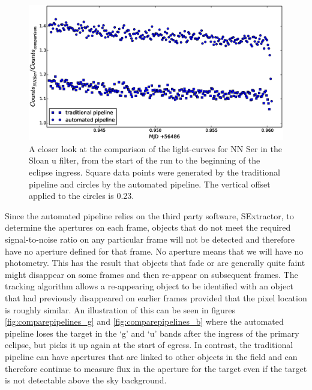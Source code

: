 \begin{figure}
\centering
\includegraphics[width=140mm]{images/nn_ser_compare_zoom_b.eps}
\caption{A closer look at the comparison of the light-curves for NN Ser in the Sloan u filter, from the start of the run to the beginning of the eclipse ingress. Square data points were generated by the traditional pipeline and circles by the automated pipeline. The vertical offset applied to the circles is 0.23. }
\label{fig:comparepipelines_zoom_b}
\end{figure}

Since the automated pipeline relies on the third party software, SExtractor, to determine the apertures on each frame, objects that do not meet the required signal-to-noise ratio on any particular frame will not be detected and therefore have no aperture defined for that frame. No aperture means that we will have no photometry. This has the result that objects that fade or are generally quite faint might disappear on some frames and then re-appear on subsequent frames. The tracking algorithm allows a re-appearing object to be identified with an object that had previously disappeared on earlier frames provided that the pixel location is roughly similar. An illustration of this can be seen in figures \ref{fig:comparepipelines_g} and \ref{fig:comparepipelines_b} where the automated pipeline loses the target in the `g' and `u' bands after the ingress of the primary eclipse, but picks it up again at the start of egress. In contrast, the traditional pipeline can have apertures that are linked to other objects in the field and can therefore continue to measure flux in the aperture for the target even if the target is not detectable above the sky background.

